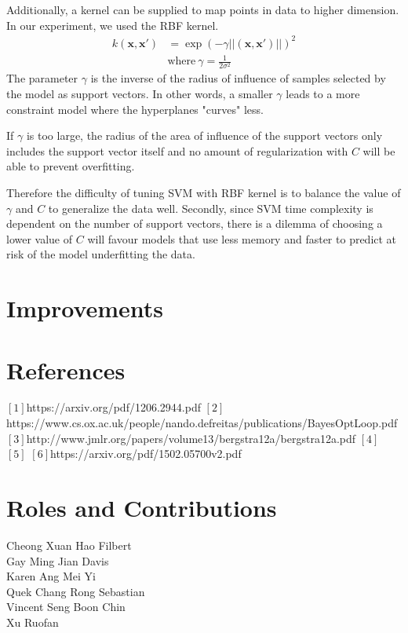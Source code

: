 \documentclass[letterpaper]{article}
\begin{document}
Additionally, a kernel can be supplied to map points in data to higher dimension. In our
experiment, we used the RBF kernel.
\begin{align*}
  k (\textbf{x},\textbf{x}') &= \exp(-\gamma||(\textbf{x},\textbf{x}')||)^2 \\
  &\text{where} \ \gamma = \frac{1}{2\sigma^2}
\end{align*}
The parameter $\gamma$ is the inverse of the radius of influence of samples selected by the
model as support vectors. In other words, a smaller $\gamma$ leads to a more constraint
model where the hyperplanes "curves" less.

If $\gamma$ is too large, the radius of the area of influence of the support vectors only
includes the support vector itself and no amount of regularization with $\textit{C}$ will be
able to prevent overfitting.

Therefore the difficulty of tuning SVM with RBF kernel is to balance the value of
$\gamma$ and $\textit{C}$ to generalize the data well. Secondly, since SVM time complexity
is dependent on the number of support vectors, there is a dilemma of choosing a lower value
of $\textit{C}$ will favour models that use less memory and faster to predict at risk of
the model underfitting the data.

\section{Improvements}

\section{References}
$[1]$https://arxiv.org/pdf/1206.2944.pdf  
$[2]$https://www.cs.ox.ac.uk/people/nando.defreitas/publications/BayesOptLoop.pdf  
$[3]$http://www.jmlr.org/papers/volume13/bergstra12a/bergstra12a.pdf  
$[4]$  
$[5]$
$[6]$https://arxiv.org/pdf/1502.05700v2.pdf
 

\section{Roles and Contributions}

\begin{description}
\item [Cheong Xuan Hao Filbert]
\item [Gay Ming Jian Davis]
\item [Karen Ang Mei Yi]
\item [Quek Chang Rong Sebastian]
\item [Vincent Seng Boon Chin]
\item [Xu Ruofan]
\end{description}



\end{document}
